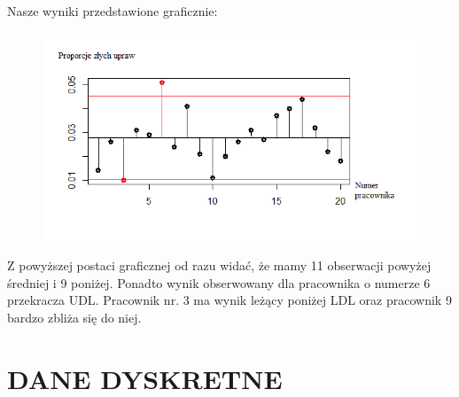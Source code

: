 \documentclass{beamer}
\begin{document}
\begin{frame}
Nasze wyniki przedstawione graficznie:
\begin{figure}
\includegraphics[scale=0.5]{ANOM2.png}
\end{figure}
Z powyższej postaci graficznej od razu widać, że mamy 11 obserwacji powyżej średniej i 9 poniżej. Ponadto wynik obserwowany dla pracownika o numerze 6 przekracza UDL. Pracownik nr. 3 ma wynik leżący poniżej LDL oraz pracownik 9 bardzo zbliża się do niej.
\end{frame}


\section{DANE DYSKRETNE}
\end{document}
